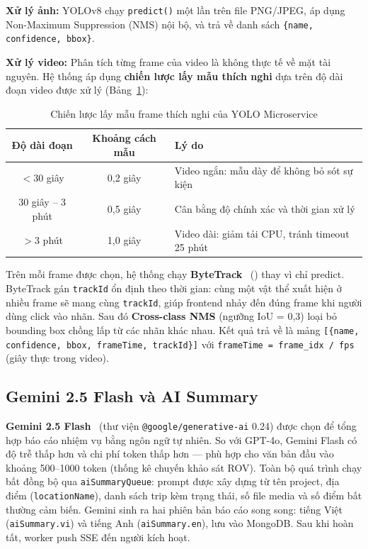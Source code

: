 \documentclass[../DoAn.tex]{subfiles}
\begin{document}
\textbf{Xử lý ảnh:} YOLOv8 chạy \texttt{predict()} một lần trên file PNG/JPEG, áp dụng Non-Maximum Suppression (NMS) nội bộ, và trả về danh sách \texttt{\{name, confidence, bbox\}}.

\textbf{Xử lý video:} Phân tích từng frame của video là không thực tế về mặt tài nguyên. Hệ thống áp dụng \textbf{chiến lược lấy mẫu thích nghi} dựa trên độ dài đoạn video được xử lý (Bảng~\ref{tab:sampling}):

\begin{table}[H]
\centering
\caption{Chiến lược lấy mẫu frame thích nghi của YOLO Microservice}
\label{tab:sampling}
\small
\begin{tabular}{|c|c|p{6.0cm}|}
\hline
\textbf{Độ dài đoạn} & \textbf{Khoảng cách mẫu} & \textbf{Lý do} \\
\hline
$< 30$ giây & 0,2 giây & Video ngắn: mẫu dày để không bỏ sót sự kiện \\
\hline
30 giây -- 3 phút & 0,5 giây & Cân bằng độ chính xác và thời gian xử lý \\
\hline
$> 3$ phút & 1,0 giây & Video dài: giảm tải CPU, tránh timeout 25 phút \\
\hline
\end{tabular}
\end{table}

Trên mỗi frame được chọn, hệ thống chạy \textbf{ByteTrack}~\cite{bytetrack} () thay vì chỉ predict. ByteTrack gán \texttt{trackId} ổn định theo thời gian: cùng một vật thể xuất hiện ở nhiều frame sẽ mang cùng \texttt{trackId}, giúp frontend nhảy đến đúng frame khi người dùng click vào nhãn. Sau đó \textbf{Cross-class NMS} (ngưỡng IoU = 0,3) loại bỏ bounding box chồng lấp từ các nhãn khác nhau. Kết quả trả về là mảng \texttt{[\{name, confidence, bbox,\allowbreak{} frameTime, trackId\}]} với \texttt{frameTime = frame\_idx / fps} (giây thực trong video).

\subsection{Gemini 2.5 Flash và AI Summary}

\textbf{Gemini 2.5 Flash}~\cite{geminiapi} (thư viện \texttt{@google/generative-ai} 0.24) được chọn để tổng hợp báo cáo nhiệm vụ bằng ngôn ngữ tự nhiên. So với GPT-4o, Gemini Flash có độ trễ thấp hơn và chi phí token thấp hơn --- phù hợp cho văn bản đầu vào khoảng 500--1000 token (thống kê chuyến khảo sát ROV). Toàn bộ quá trình chạy bất đồng bộ qua \texttt{aiSummaryQueue}: prompt được xây dựng từ tên project, địa điểm (\texttt{locationName}), danh sách trip kèm trạng thái, số file media và số điểm bất thường cảm biến. Gemini sinh ra hai phiên bản báo cáo song song: tiếng Việt (\texttt{aiSummary.vi}) và tiếng Anh (\texttt{aiSummary.en}), lưu vào MongoDB. Sau khi hoàn tất, worker push SSE đến người kích hoạt.
\end{document}
